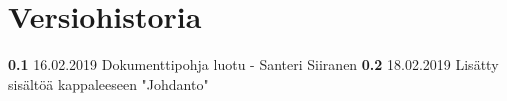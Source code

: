 \chapter*{Versiohistoria}

\newcommand{\currentversion}{0.1} %

\textbf{0.1} 16.02.2019 Dokumenttipohja luotu - Santeri Siiranen
\textbf{0.2} 18.02.2019 Lisätty sisältöä kappaleeseen "Johdanto"
